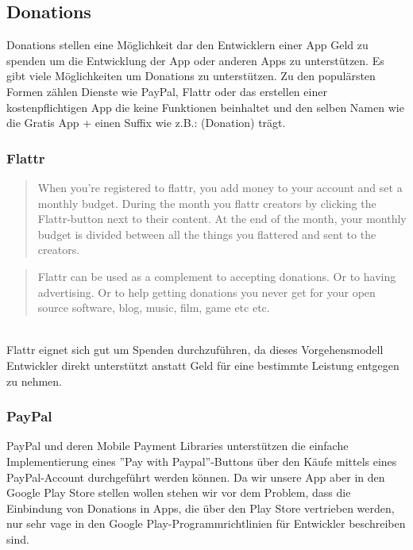 \documentclass[FIPLY_base.tex]{subfiles}
\author{Andreas Denkmayr}
\date{25. Februar 2016}
\begin{document}
\subsection{Donations}
Donations stellen eine Möglichkeit dar den Entwicklern einer App Geld zu spenden um die Entwicklung der App oder anderen Apps zu unterstützen.
Es gibt viele Möglichkeiten um Donations zu unterstützen.\newline
Zu den populärsten Formen zählen Dienste wie PayPal, Flattr oder das erstellen einer kostenpflichtigen App die keine Funktionen beinhaltet und den selben Namen wie die Gratis App + einen Suffix wie z.B.: (Donation) trägt.


\subsubsection{Flattr}
\begin{quote}
When you're registered to flattr, you add money to your account and set a monthly budget. During the month you flattr creators by clicking the Flattr-button next to their content. At the end of the month, your monthly budget is divided between all the things you flattered and sent to the creators.
\end{quote}\cite{flattr} 

\begin{quote}
Flattr can be used as a complement to accepting donations. Or to having advertising. Or to help getting donations you never get for your open source software, blog, music, film, game etc etc.
\end{quote}\cite{flattr} 

\ \\
Flattr eignet sich gut um Spenden durchzuführen, da dieses Vorgehensmodell Entwickler direkt unterstützt anstatt Geld für eine bestimmte Leistung entgegen zu nehmen. 

\newpage
\subsubsection{PayPal}
PayPal und deren Mobile Payment Libraries unterstützen die einfache Implementierung eines ''Pay with Paypal''-Buttons über den Käufe mittels eines PayPal-Account durchgeführt werden können.
Da wir unsere App aber in den Google Play Store stellen wollen stehen wir vor dem Problem, dass die Einbindung von Donations in Apps, die über den Play Store vertrieben werden, nur sehr vage in den Google Play-Programmrichtlinien für Entwickler beschreiben sind.
\end{document}
